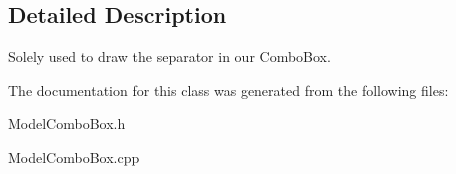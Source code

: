 \subsection{Detailed Description}
Solely used to draw the separator in our Combo\+Box. 

The documentation for this class was generated from the following files\+:\begin{DoxyCompactItemize}
\item 
Model\+Combo\+Box.\+h\item 
Model\+Combo\+Box.\+cpp\end{DoxyCompactItemize}
